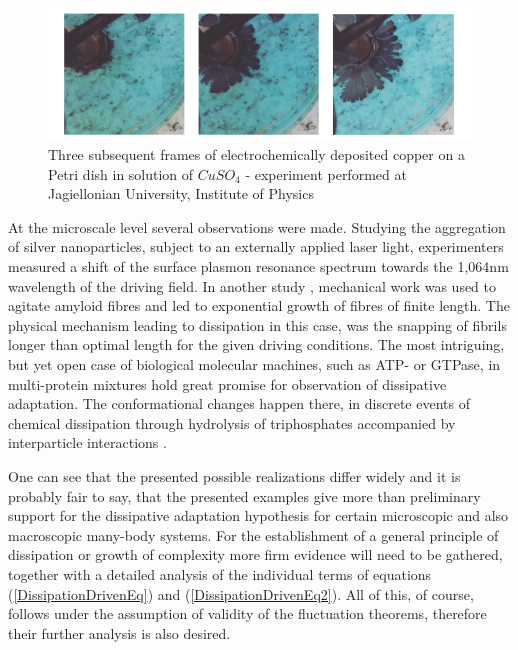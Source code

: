 \documentclass[a4paper,12pt]{article}
\begin{document}
\begin{figure}[ht!]
\centering \includegraphics[width=14cm]{Figure6} \caption{Three subsequent frames of electrochemically deposited copper on a Petri dish in solution of $CuSO_4$ - experiment performed at Jagiellonian University, Institute of Physics}
\label{Fig6} 
\end{figure}

At the microscale  level several observations were made.
Studying the aggregation of silver nanoparticles, subject to an externally applied laser light, experimenters \cite{Ito:2013fh} measured a shift of the surface plasmon resonance spectrum towards the 1,064nm wavelength of the driving field.
In another study \cite{Carnall:2010ju}, mechanical work was used to agitate amyloid fibres and led to exponential growth of fibres of finite length. The physical mechanism leading to dissipation in this case, was the snapping of fibrils longer than optimal length for the given driving conditions.
The most intriguing, but yet open case of biological molecular machines, such as ATP- or GTPase, in multi-protein mixtures hold great promise for observation of dissipative adaptation. The conformational changes happen there, in discrete events of chemical dissipation through hydrolysis of triphosphates accompanied by interparticle interactions \cite{Schaller:2010cq}.

One can see that the presented possible realizations differ widely and it is probably fair to say, that the presented examples give more than preliminary support for the dissipative adaptation hypothesis for certain microscopic and also macroscopic many-body systems. 
For the establishment of a general principle of dissipation or growth of complexity more firm evidence will need to be gathered, together with a detailed analysis of the individual terms of equations (\ref{DissipationDrivenEq}) and (\ref{DissipationDrivenEq2}). All of this, of course, follows under the assumption of validity of the fluctuation theorems, therefore their further analysis is also desired.

\end{document}
